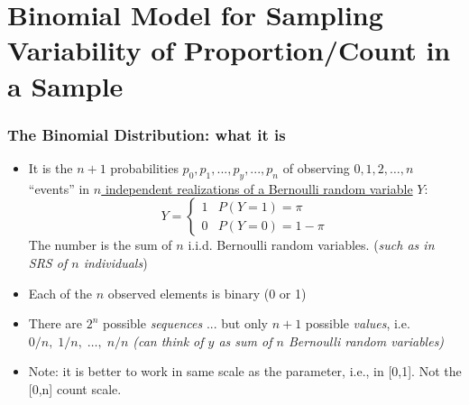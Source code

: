 \documentclass[10pt]{beamer}\usepackage[]{graphicx}\usepackage[]{color}
\begin{document}
\section{Binomial Model for Sampling Variability of Proportion/Count in a Sample}




\begin{frame}
	\frametitle{The Binomial Distribution: what it is}
	\small
	\begin{itemize}
		\setlength\itemsep{0.5em}
		\item It is the $n+1$ probabilities $p_{0}, p_{1}, ..., p_{y}, ..., p_{n}$ of observing 
		$0, 1, 2, \dots , n$ ``events''  in \underline{$n$ independent realizations of a Bernoulli random variable} $Y$:
		$$
		Y = \begin{cases}
		1 & P(Y=1) = \pi \\
		0 & P(Y=0) = 1-\pi
		\end{cases}	
		$$
		The number is the sum of $n$ i.i.d. Bernoulli random variables.	(\emph{such as in SRS of $n$ individuals}) \pause 
		\item Each of the $n$ observed elements is binary (0 or 1) %
		\item There are $2^{n}$ possible \textit{sequences} ... but only $n+1$ possible \textit{values}, 
		i.e. $0/n,\;1/n,\;\dots ,\;n/n$  \emph{(can think of $y$ as sum of $n$ Bernoulli random variables)} 
		\item Note: it is better to work in same scale as the parameter, i.e., in [0,1]. Not the [0,n] count scale.
	\end{itemize}
\end{frame}	
\end{document}
